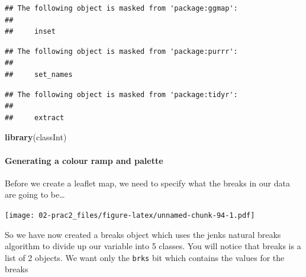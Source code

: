 \documentclass[]{book}
\newenvironment{Shaded}{\begin{snugshade}}{\end{snugshade}}
\newcommand{\DataTypeTok}[1]{\textcolor[rgb]{0.13,0.29,0.53}{#1}}
\newcommand{\DecValTok}[1]{\textcolor[rgb]{0.00,0.00,0.81}{#1}}
\newcommand{\FloatTok}[1]{\textcolor[rgb]{0.00,0.00,0.81}{#1}}
\newcommand{\KeywordTok}[1]{\textcolor[rgb]{0.13,0.29,0.53}{\textbf{#1}}}
\newcommand{\NormalTok}[1]{#1}
\newcommand{\OperatorTok}[1]{\textcolor[rgb]{0.81,0.36,0.00}{\textbf{#1}}}
\newcommand{\StringTok}[1]{\textcolor[rgb]{0.31,0.60,0.02}{#1}}
\let\oldparagraph\paragraph
\renewcommand{\paragraph}[1]{\oldparagraph{#1}\mbox{}}
\begin{document}
\begin{verbatim}
## The following object is masked from 'package:ggmap':
## 
##     inset
\end{verbatim}

\begin{verbatim}
## The following object is masked from 'package:purrr':
## 
##     set_names
\end{verbatim}

\begin{verbatim}
## The following object is masked from 'package:tidyr':
## 
##     extract
\end{verbatim}

\begin{Shaded}
\begin{Highlighting}[]
\KeywordTok{library}\NormalTok{(classInt)}
\end{Highlighting}
\end{Shaded}

\hypertarget{generating-a-colour-ramp-and-palette}{%
\paragraph{Generating a colour ramp and palette}\label{generating-a-colour-ramp-and-palette}}

Before we create a leaflet map, we need to specify what the breaks in our data are going to be\ldots{}

\begin{Shaded}
\end{Shaded}

\texttt{[image: 02-prac2\_files/figure-latex/unnamed-chunk-94-1.pdf]}

So we have now created a breaks object which uses the jenks natural breaks algorithm to divide up our variable into 5 classes. You will notice that breaks is a list of 2 objects. We want only the \texttt{brks} bit which contains the values for the breaks
\end{document}
